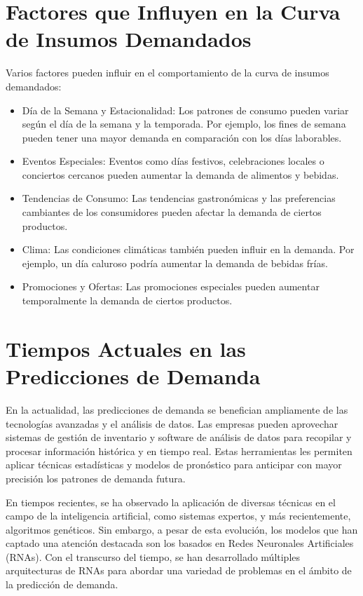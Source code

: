 \section{Factores que Influyen en la Curva de Insumos Demandados}

Varios factores pueden influir en el comportamiento de la curva de insumos demandados:

\begin{itemize}
    \item Día de la Semana y Estacionalidad: Los patrones de consumo pueden variar según el día de la semana y la temporada. Por ejemplo, los fines de semana pueden tener una mayor demanda en comparación con los días laborables.
    
    \item Eventos Especiales: Eventos como días festivos, celebraciones locales o conciertos cercanos pueden aumentar la demanda de alimentos y bebidas.
    
    \item Tendencias de Consumo: Las tendencias gastronómicas y las preferencias cambiantes de los consumidores pueden afectar la demanda de ciertos productos.
    
    \item Clima: Las condiciones climáticas también pueden influir en la demanda. Por ejemplo, un día caluroso podría aumentar la demanda de bebidas frías.
    
    \item Promociones y Ofertas: Las promociones especiales pueden aumentar temporalmente la demanda de ciertos productos.
\end{itemize}

\section{Tiempos Actuales en las Predicciones de Demanda}

En la actualidad, las predicciones de demanda se benefician ampliamente de las tecnologías avanzadas y el análisis de datos. Las empresas pueden aprovechar sistemas de gestión de inventario y software de análisis de datos para recopilar y procesar información histórica y en tiempo real. Estas herramientas les permiten aplicar técnicas estadísticas y modelos de pronóstico para anticipar con mayor precisión los patrones de demanda futura.

En tiempos recientes, se ha observado la aplicación de diversas técnicas en el campo de la inteligencia artificial, como sistemas expertos, y más recientemente, algoritmos genéticos. Sin embargo, a pesar de esta evolución, los modelos que han captado una atención destacada son los basados en Redes Neuronales Artificiales (RNAs). Con el transcurso del tiempo, se han desarrollado múltiples arquitecturas de RNAs para abordar una variedad de problemas en el ámbito de la predicción de demanda.



